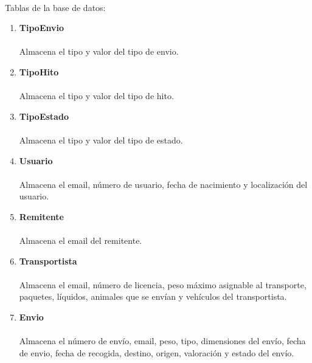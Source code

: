 \documentclass[10pt, a4paper,spanish]{article}
\begin{document}
	    \paragraph{}
	    Tablas de la base de datos:
	    \begin{enumerate}
				\item \textbf {TipoEnvio}
				    \paragraph{}
				    Almacena el tipo y valor del tipo de envio.
				\item \textbf {TipoHito}
			        \paragraph{}
			        Almacena el tipo y valor del tipo de hito.
				\item \textbf {TipoEstado}
				    \paragraph{}
				    Almacena el tipo y valor del tipo de estado.

				\item \textbf {Usuario}
			        \paragraph{}
			        Almacena el email, número de usuario, fecha de nacimiento y localización del usuario.
				\item \textbf {Remitente}
					\paragraph{}
					Almacena el email del remitente.

				\item \textbf {Transportista}
				    \paragraph{}
					Almacena el email, número de licencia, peso máximo asignable al transporte, paquetes, líquidos, animales que se envían y vehículos del transportista.

				\item \textbf {Envio}
					\paragraph{}
					Almacena el número de envío, email, peso, tipo, dimensiones del envío, fecha de envio, fecha de recogida, destino, origen, valoración y estado del envío.


\end{enumerate}
\end{document}
